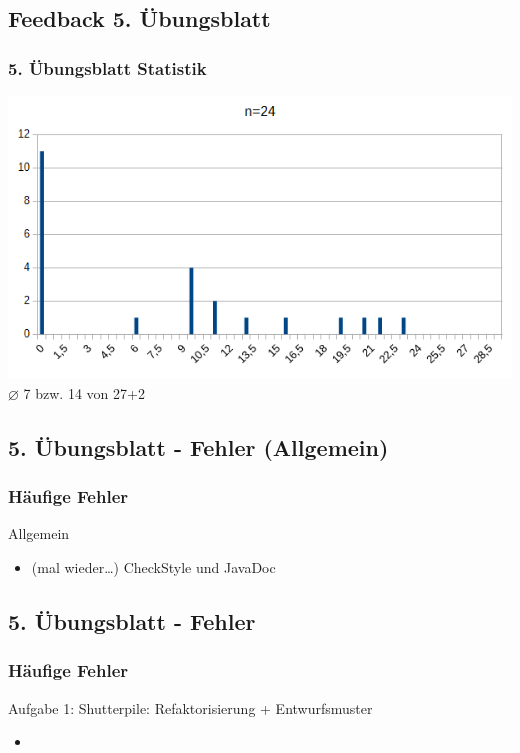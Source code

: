 \documentclass[18pt]{beamer}
\begin{document}
	\subsection{Feedback 5. Übungsblatt}
	\begin{frame}
		\frametitle{5. Übungsblatt Statistik}
		\includegraphics[scale=0.7]{./pics/tut5/statistics-ub5-2.png}
		\linebreak \centering $\diameter$ 7 bzw. 14 von 27+2
	\end{frame}

	\subsection{5. Übungsblatt - Fehler (Allgemein)}
	\begin{frame}
		\frametitle{Häufige Fehler}
		\begin{block}{Allgemein}
			\begin{itemize}
				\item (mal wieder\dots) CheckStyle und JavaDoc
			\end{itemize}
		\end{block}
	\end{frame}

	\subsection{5. Übungsblatt - Fehler}
	\begin{frame}
		\frametitle{Häufige Fehler}
		\begin{block}{Aufgabe 1: Shutterpile: Refaktorisierung + Entwurfsmuster}
			\begin{itemize}
				\pause 
				\item %
			\end{itemize}
		\end{block}
	\end{frame}
\end{document}
